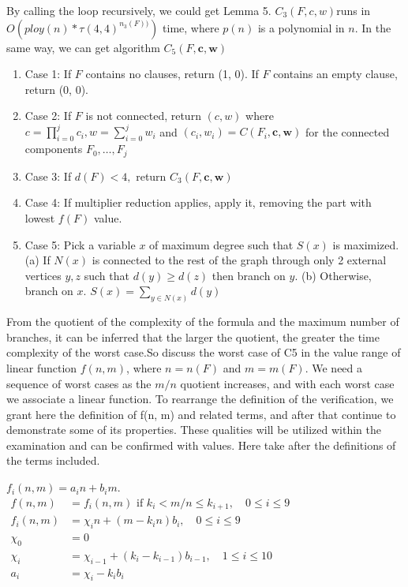 \documentclass{sigchi}
\begin{document}
By calling the loop recursively, we could get Lemma 5. $C_{3}(F ,c,w)$runs in $O(ploy(n)*\tau(4,4)^{n_{3}(F))})$ time, where $p(n)$ is a polynomial in $n$. In the same way, we can get	algorithm $C_{5}(F, \mathbf{c}, \mathbf{w})$
\begin{enumerate}
	\item Case 1: If $F$ contains no clauses, return (1, 0). If $F$ contains an empty clause, return (0, 0).
	\item Case 2: If $F$ is not connected, return $(c, w)$ where $c=\prod_{i=0}^{j} c_{i}, w=\sum_{i=0}^{j} w_{i}$ and $\left(c_{i}, w_{i}\right)=C\left(F_{i}, \mathbf{c}, \mathbf{w}\right)$ for the connected components $F_{0}, \ldots, F_{j}$
	\item Case 3: If $d(F)<4,$ return $C_{3}(F, \mathbf{c}, \mathbf{w})$ 
	\item Case 4: If multiplier reduction applies, apply it, removing the part with lowest $f(F)$ value.
	\item Case 5: Pick a variable $x$ of maximum degree such that $S(x)$ is maximized. (a) If $N(x)$ is connected to the rest of the graph through only 2 external vertices $y, z$ such that $d(y) \geqslant d(z)$ then branch on $y .$
	(b) Otherwise, branch on $x .$
	$S(x)=\sum_{y \in N(x)} d(y)$
\end{enumerate}
From the quotient of the complexity of the formula and the maximum number of branches, it can be inferred that the larger the quotient, the greater the time complexity of the worst case.So discuss the worst case of C5 in the value range of linear function $f\left(n,m\right)$, where $n=n(F)$ and $m=m(F)$. 
We need a sequence of worst cases as the $m / n$ quotient increases, and with each worst case we associate a linear function. To rearrange the definition of the verification, we grant here the definition of f(n, m) and related terms, and after that continue to demonstrate some of its properties. These qualities will be utilized within the examination and can be confirmed with values. 
Here take after the deﬁnitions of the terms included.
\begin{center}
	$f_{i}(n, m)=a_{i} n+b_{i} m$. \\
	$\begin{aligned} f(n, m) &=f_{i}(n, m) \text { if } k_{i}<m / n \leqslant k_{i+1}, \quad 0 \leqslant i \leqslant 9 \\ f_{i}(n, m) &=\chi_{i} n+\left(m-k_{i} n\right) b_{i}, \quad 0 \leqslant i \leqslant 9 \\ \chi_{0} &=0 \\ \chi_{i} &=\chi_{i-1}+\left(k_{i}-k_{i-1}\right) b_{i-1}, \quad 1 \leqslant i \leqslant 10 \\ a_{i} &=\chi_{i}-k_{i} b_{i} \end{aligned}$\\
\end{center}
\end{document}
